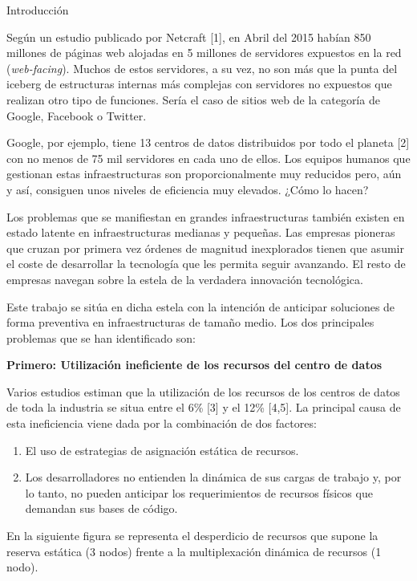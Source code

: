 \documentclass[a4paper,12pt,spanish,final]{epsc_tfc_pfc}
\begin{document}

\begin{intro}{Introducción}

  Según un estudio publicado por Netcraft [1], en Abril del 2015 habían 850 millones de páginas web alojadas en 5 millones de servidores expuestos en la red (\emph{web-facing}). Muchos de estos servidores, a su vez, no son más que la punta del iceberg de estructuras internas más complejas con servidores no expuestos que realizan otro tipo de funciones. Sería el caso de sitios web de la categoría de Google, Facebook o Twitter.

  Google, por ejemplo, tiene 13 centros de datos distribuidos por todo el planeta [2] con no menos de 75 mil servidores en cada uno de ellos. Los equipos humanos que gestionan estas infraestructuras son proporcionalmente muy reducidos pero, aún y así, consiguen unos niveles de eficiencia muy elevados. ¿Cómo lo hacen?

Los problemas que se manifiestan en grandes infraestructuras también existen en estado latente en infraestructuras medianas y pequeñas. Las empresas pioneras que cruzan por primera vez órdenes de magnitud inexplorados tienen que asumir el coste de desarrollar la tecnología que les permita seguir avanzando. El resto de empresas navegan sobre la estela de la verdadera innovación tecnológica.

Este trabajo se sitúa en dicha estela con la intención de anticipar soluciones de forma preventiva en infraestructuras de tamaño medio. Los dos principales problemas que se han identificado son:

\textbf{Primero: Utilización ineficiente de los recursos del centro de datos}

Varios estudios estiman que la utilización de los recursos de los centros de datos de toda la industria se situa entre el 6\% [3] y el 12\% [4,5]. La principal causa de esta ineficiencia viene dada por la combinación de dos factores:
\begin{enumerate}
  \item El uso de estrategias de asignación estática de recursos.
  \item Los desarrolladores no entienden la dinámica de sus cargas de trabajo y, por lo tanto, no pueden anticipar los requerimientos de recursos físicos que demandan sus bases de código.
\end{enumerate}

En la siguiente figura se representa el desperdicio de recursos que supone la reserva estática (3 nodos) frente a la multiplexación dinámica de recursos (1 nodo).


\end{intro}
\end{document}
